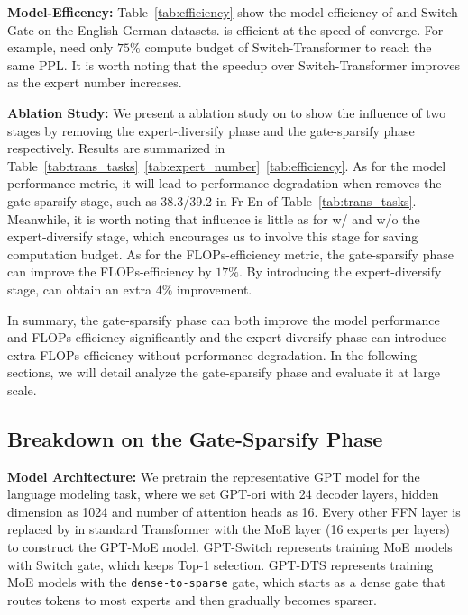 \textbf{Model-Efficency:} Table~\ref{tab:efficiency} show the model efficiency of \ourmethods{} and Switch Gate on the English-German datasets. \ourmethods{} is efficient at the speed of converge. For example, \ourmethods{} need only $75\%$ compute budget of Switch-Transformer to reach the same PPL. It is worth noting that the speedup over Switch-Transformer improves as the expert number increases. 

\textbf{Ablation Study:}
We present a ablation study on \ourmethods{} to show the influence of two stages by removing the expert-diversify phase and the gate-sparsify phase respectively. Results are summarized in Table~\ref{tab:trans_tasks}~\ref{tab:expert_number}~\ref{tab:efficiency}.
As for the model performance metric, it will lead to performance degradation when \ourmethods{} removes the gate-sparsify stage, such as 38.3/39.2 in Fr-En of Table~\ref{tab:trans_tasks}. 
Meanwhile, it is worth noting that influence is little as for w/ and w/o the expert-diversify stage, which encourages us to involve this stage for saving computation budget.
As for the FLOPs-efficiency metric, the gate-sparsify phase can improve the FLOPs-efficiency by $17\%$. By introducing the expert-diversify stage, \ourmethods{} can obtain an extra $4\%$ improvement.

In summary, the gate-sparsify phase can both improve the model performance and FLOPs-efficiency significantly and the expert-diversify phase can introduce extra FLOPs-efficiency without performance degradation. In the following sections, we will detail analyze the gate-sparsify phase and evaluate it at large scale.

\subsection{Breakdown on the Gate-Sparsify Phase}

\textbf{Model Architecture:} We pretrain the representative GPT model for the language modeling task, where we set GPT-ori with 24 decoder layers, hidden dimension as 1024 and number of attention heads as 16. 
Every other FFN layer is replaced by in standard Transformer with the MoE layer (16 experts per layers) to construct the GPT-MoE model. 
GPT-Switch represents training MoE models with Switch gate, which keeps Top-1 selection.
GPT-DTS represents training MoE models with the \texttt{dense-to-sparse} gate, which starts as a dense gate that routes tokens to most experts and then gradually becomes sparser. 

